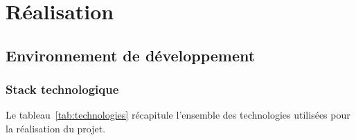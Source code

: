 \chapter{Réalisation}

\section{Environnement de développement}

\subsection{Stack technologique}

Le tableau~\ref{tab:technologies} récapitule l'ensemble des technologies utilisées pour la réalisation du projet.

